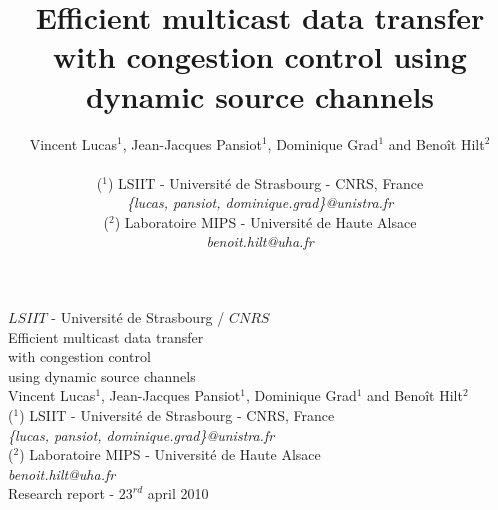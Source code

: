\documentclass[a4paper]{article}
\begin{document}
    \begin{center}
        {\large
            $LSIIT$ - Universit\'e de Strasbourg / $CNRS$
            \\
            \vspace{4cm}
            {\huge
                Efficient multicast data transfer\\
                    with congestion control\\
                    using dynamic source channels
            }
            \\
            \vspace{2cm}
            {\Large
                Vincent Lucas$^1$,
                Jean-Jacques Pansiot$^1$,
                Dominique Grad$^1$
                and Beno\^it Hilt$^2$
            }
            \\
            \vspace{1cm}
            ($^1$) LSIIT - Universit\'e de Strasbourg - CNRS, France\\
            \textit{\{lucas, pansiot, dominique.grad\}@unistra.fr}\\
            ($^2$) Laboratoire MIPS - Universit\'e de Haute Alsace\\
            \textit{benoit.hilt@uha.fr}
            \\
            \vspace{5cm}
            {\Large
                Research report - $23^{rd}$ april 2010
            }
        }
    \end{center}
    \newpage

\title{
    Efficient multicast data transfer with congestion control using dynamic
        source channels
}

\author{Vincent Lucas$^1$,
    Jean-Jacques Pansiot$^1$,
    Dominique Grad$^1$
    and Beno\^it Hilt$^2$
    \\
    \\
    ($^1$) LSIIT - Universit\'e de Strasbourg - CNRS, France\\
    \textit{\{lucas, pansiot, dominique.grad\}@unistra.fr}\\
    ($^2$) Laboratoire MIPS - Universit\'e de Haute Alsace\\
    \textit{benoit.hilt@uha.fr}
}

\maketitle
\end{document}
